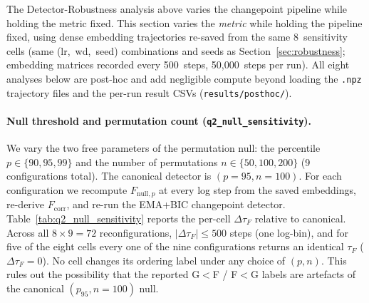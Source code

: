 \documentclass{article}
\newcommand{\tauf}{\tau_{F}}
\newcommand{\fcorr}{F_{\mathrm{corr}}}
\begin{document}
The Detector-Robustness analysis above varies the changepoint
pipeline while holding the metric fixed.
This section varies the \emph{metric} while holding the pipeline
fixed, using dense embedding trajectories re-saved from the same
8~sensitivity cells (same (lr,~wd,~seed) combinations and seeds as
Section~\ref{sec:robustness}; embedding matrices recorded every
500~steps, 50{,}000~steps per run).
All eight analyses below are post-hoc and add negligible compute
beyond loading the \texttt{.npz} trajectory files and the
per-run result CSVs (\texttt{results/posthoc/}).

\paragraph{Null threshold and permutation count (\texttt{q2\_null\_sensitivity}).}
We vary the two free parameters of the permutation null: the
percentile $p\in\{90,95,99\}$ and the number of permutations
$n\in\{50,100,200\}$ (9 configurations total).
The canonical detector is $(p{=}95,n{=}100)$.
For each configuration we recompute $F_{\mathrm{null},p}$ at every
log step from the saved embeddings, re-derive $\fcorr$, and re-run
the EMA+BIC changepoint detector.
Table~\ref{tab:q2_null_sensitivity} reports the
per-cell $\Delta\tauf$ relative to canonical.
Across all $8\times9=72$ reconfigurations, $|\Delta\tauf|\leq500$
steps (one log-bin), and for five of the eight cells every one of
the nine configurations returns an identical $\tauf$
($\Delta\tauf=0$).
No cell changes its ordering label under any choice of
$(p,n)$.
This rules out the possibility that the reported G$<$F / F$<$G
labels are artefacts of the canonical $(p_{95},n{=}100)$ null.
\end{document}
